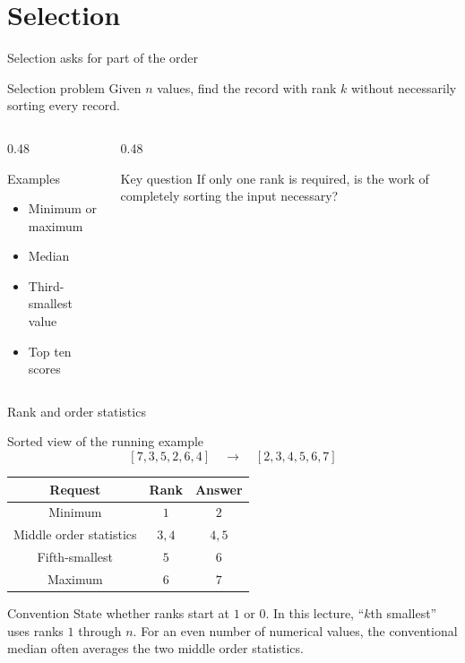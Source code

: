 \documentclass[aspectratio=169]{beamer}
\begin{document}
\section{ Selection}

\begin{frame}{Selection asks for part of the order}
  \begin{block}{Selection problem}
    Given $n$ values, find the record with rank $k$ without necessarily sorting
    every record.
  \end{block}
  \begin{columns}[T]
    \begin{column}{0.48\textwidth}
      \begin{exampleblock}{Examples}
        \begin{itemize}
          \item Minimum or maximum
          \item Median
          \item Third-smallest value
          \item Top ten scores
        \end{itemize}
      \end{exampleblock}
    \end{column}
    \begin{column}{0.48\textwidth}
      \begin{alertblock}{Key question}
        If only one rank is required, is the work of completely sorting the
        input necessary?
      \end{alertblock}
    \end{column}
  \end{columns}
\end{frame}

\begin{frame}{Rank and order statistics}
  \small
  \begin{block}{Sorted view of the running example}
    \[
      [7,3,5,2,6,4]\quad\longrightarrow\quad[2,3,4,5,6,7]
    \]
  \end{block}
  \begin{center}
    \begin{tabular}{ccc}
      \toprule
      \textbf{Request} & \textbf{Rank} & \textbf{Answer} \\
      \midrule
      Minimum & $1$ & $2$ \\
      Middle order statistics & $3,4$ & $4,5$ \\
      Fifth-smallest & $5$ & $6$ \\
      Maximum & $6$ & $7$ \\
      \bottomrule
    \end{tabular}
  \end{center}
  \begin{alertblock}{Convention}
    State whether ranks start at $1$ or $0$. In this lecture, ``$k$th smallest''
    uses ranks $1$ through $n$. For an even number of numerical values, the
    conventional median often averages the two middle order statistics.
  \end{alertblock}
\end{frame}
\end{document}
